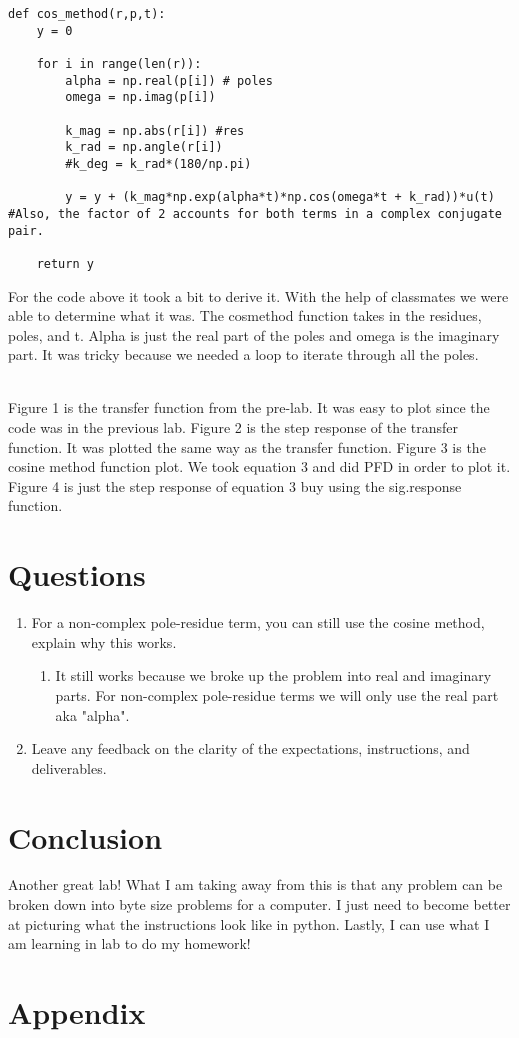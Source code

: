 \documentclass[12pt]{article}
\begin{document}
\begin{lstlisting}
def cos_method(r,p,t):
    y = 0
    
    for i in range(len(r)):
        alpha = np.real(p[i]) # poles
        omega = np.imag(p[i])
        
        k_mag = np.abs(r[i]) #res
        k_rad = np.angle(r[i])
        #k_deg = k_rad*(180/np.pi)
        
        y = y + (k_mag*np.exp(alpha*t)*np.cos(omega*t + k_rad))*u(t) #Also, the factor of 2 accounts for both terms in a complex conjugate pair.

    return y
\end{lstlisting}

For the code above it took a bit to derive it. With the help of classmates we were able to determine what it was.
The cos\textunderscore method function takes in the residues, poles, and t. Alpha is just the real part of the poles and omega is the imaginary part. It was tricky because we needed a loop to iterate through all the poles.

\\
Figure 1 is the transfer function from the pre-lab. It was easy to plot since the code was in the previous lab. Figure 2 is the step response of the transfer function. It was plotted the same way as the transfer function. Figure 3 is the cosine method function plot. We took equation 3 and did PFD in order to plot it. Figure 4 is just the step response of equation 3 buy using the sig.response function.

\section*{Questions}
\begin{enumerate}
   \item For a non-complex pole-residue term, you can still use the cosine method, explain why this
works.
    \begin{enumerate}
        \item It still works because we broke up the problem into real and imaginary parts. For non-complex pole-residue terms we will only use the real part aka "alpha".
    \end{enumerate}
    \item Leave any feedback on the clarity of the expectations, instructions, and deliverables.
\end{enumerate}

\section*{Conclusion}
Another great lab! What I am taking away from this is that any problem can be broken down into byte size problems for a computer. I just need to become better at picturing what the instructions look like in python. Lastly, I can use what I am learning in lab to do my homework!


\section*{Appendix}
\end{document}
